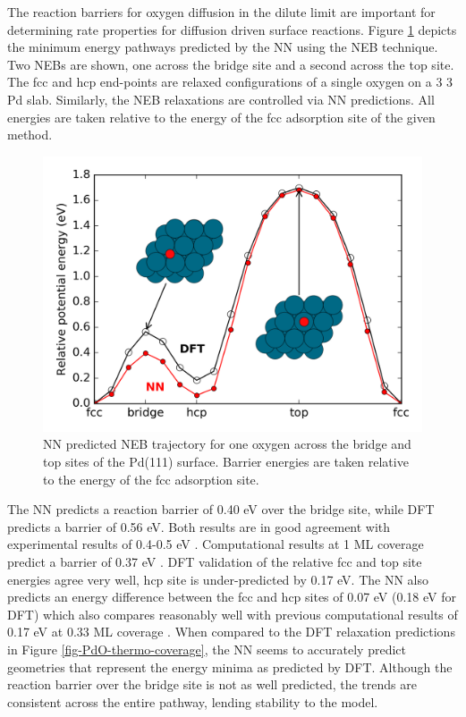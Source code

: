 \documentclass[12pt,oneside]{cmuthesis}
\begin{document}
The reaction barriers for oxygen diffusion in the dilute limit are important for determining rate properties for diffusion driven surface reactions. Figure \ref{fig-PdO1-NEB} depicts the minimum energy pathways predicted by the NN using the NEB technique. Two NEBs are shown, one across the bridge site and a second across the top site. The fcc and hcp end-points are relaxed configurations of a single oxygen on a 3 \texttimes{} 3 Pd slab. Similarly, the NEB relaxations are controlled via NN predictions. All energies are taken relative to the energy of the fcc adsorption site of the given method.

\begin{figure}[htbp]
\centering
\includegraphics[width=5.5in]{./images/PdO1-NEB.png}
\caption{\label{fig-PdO1-NEB}
NN predicted NEB trajectory for one oxygen across the bridge and top sites of the Pd(111) surface. Barrier energies are taken relative to the energy of the fcc adsorption site.}
\end{figure}

The NN predicts a reaction barrier of 0.40 eV over the bridge site, while DFT predicts a barrier of 0.56 eV. Both results are in good agreement with experimental results of 0.4-0.5 eV \cite{rose-2004-chemis-atomic}. Computational results at 1 ML coverage predict a barrier of 0.37 eV \cite{markovits-2008-move-stron}. DFT validation of the relative fcc and top site energies agree very well, hcp site is under-predicted by 0.17 eV. The NN also predicts an energy difference between the fcc and hcp sites of 0.07 eV (0.18 eV for DFT) which also compares reasonably well with previous computational results of 0.17 eV at 0.33 ML coverage \cite{honkala-2001-ab-initio}. When compared to the DFT relaxation predictions in Figure \ref{fig-PdO-thermo-coverage}, the NN seems to accurately predict geometries that represent the energy minima as predicted by DFT. Although the reaction barrier over the bridge site is not as well predicted, the trends are consistent across the entire pathway, lending stability to the model.
\end{document}
